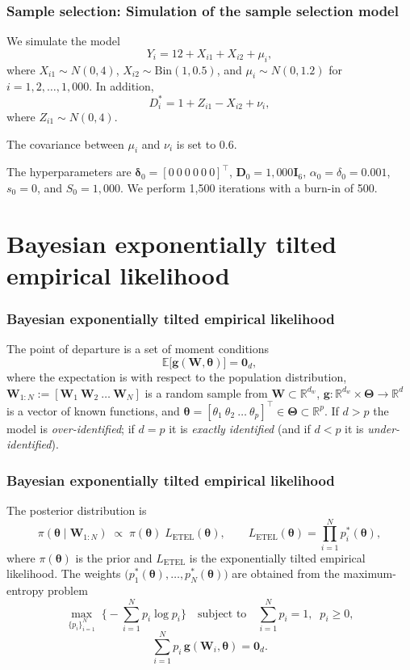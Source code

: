\documentclass[12pt, compress]{beamer}
\begin{document}
\begin{frame}
	\frametitle{Sample selection: Simulation of the sample selection model}
We simulate the model 
\[
Y_i = 12 + X_{i1} + X_{i2} + \mu_i,
\]
where $X_{i1}\sim N(0,4)$, $X_{i2}\sim \text{Bin}(1,0.5)$, and $\mu_i\sim N(0,1.2)$ for $i=1,2,\dots,1,000$.  
In addition, 
\[
D_i^* = 1 + Z_{i1} - X_{i2} + \nu_i,
\]
where $Z_{i1}\sim N(0,4)$.

The covariance between $\mu_i$ and $\nu_i$ is set to $0.6$.

The hyperparameters are $\boldsymbol{\delta}_0=[0 \ 0 \ 0 \ 0 \ 0 \ 0]^{\top}$, $\mathbf{D}_0=1,000\mathbf{I}_6$, $\alpha_0=\delta_0=0.001$, $s_0=0$, and $S_0=1,000$. We perform 1,500 iterations with a burn-in of 500.
\end{frame}

\section{Bayesian exponentially tilted empirical likelihood}

\begin{frame}
	\frametitle{Bayesian exponentially tilted empirical likelihood}
    The point of departure is a set of moment conditions
\[
\mathbb{E}\!\big[\mathbf{g}(\mathbf{W},\boldsymbol{\theta})\big]=\mathbf{0}_{d},
\]
where the expectation is with respect to the population distribution, $\mathbf{W}_{1:N}:=[\mathbf{W}_1 \ \mathbf{W}_2 \ \dots \ \mathbf{W}_N]$ is a random sample from $\mathbf{W}\subset \mathbb{R}^{d_w}$, $\mathbf{g}:\mathbb{R}^{d_w}\times\boldsymbol{\Theta}\to\mathbb{R}^{d}$ is a vector of known functions, and 
$\boldsymbol{\theta}=[\theta_{1}\ \theta_{2}\ \dots\ \theta_{p}]^{\top}\in\boldsymbol{\Theta}\subset\mathbb{R}^{p}$.
If $d>p$ the model is \emph{over-identified}; if $d=p$ it is \emph{exactly identified} (and if $d<p$ it is \emph{under-identified}).
\end{frame}

\begin{frame}
	\frametitle{Bayesian exponentially tilted empirical likelihood}
The posterior distribution is
\[
\pi(\boldsymbol{\theta}\mid \mathbf{W}_{1:N})
\;\propto\;
\pi(\boldsymbol{\theta})\; L_{\mathrm{ETEL}}(\boldsymbol{\theta}),
\qquad
L_{\mathrm{ETEL}}(\boldsymbol{\theta})=\prod_{i=1}^N p_i^{*}(\boldsymbol{\theta}),
\]
where $\pi(\boldsymbol{\theta})$ is the prior and $L_{\mathrm{ETEL}}$ is the exponentially tilted empirical likelihood. The weights
$\big(p_1^{*}(\boldsymbol{\theta}),\dots,p_N^{*}(\boldsymbol{\theta})\big)$ are obtained from the maximum-entropy problem
\[
\max_{\{p_i\}_{i=1}^N}\;\Big\{-\sum_{i=1}^N p_i\log p_i\Big\}
\quad\text{subject to}\quad
\sum_{i=1}^N p_i=1,\;\; p_i\ge 0,\]
\[
\sum_{i=1}^N p_i\,\mathbf{g}(\mathbf{W}_i,\boldsymbol{\theta})=\mathbf{0}_d.
\]

\end{frame}
\end{document}
